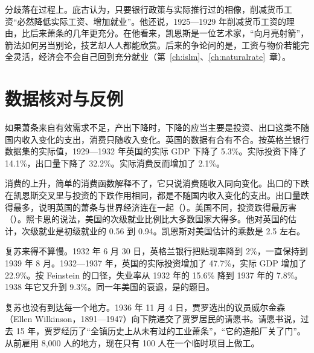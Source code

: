 分歧落在过程上。庇古认为，只要银行政策与实际推行过的相像，削减货币工资“必然降低实际工资、增加就业”\cite{pigou1936}。他还说，1925—1929 年削减货币工资的理由，比后来萧条的几年更充分\cite{pigou1936}。在他看来，凯恩斯是一位艺术家，“向月亮射箭”，箭法如何另当别论，技艺却人人都能欣赏\cite{pigou1936}。后来的争论问的是，工资与物价若能完全灵活，经济会不会自己回到充分就业（第~\ref{ch:islm}、\ref{ch:naturalrate}~章）。

\section{数据核对与反例}\label{sec:generaltheory-check}

如果萧条来自有效需求不足，产出下降时，下降的应当主要是投资、出口这类不随国内收入变化的支出，消费只随收入变化。英国的数据有合有不合。按英格兰银行数据集的实际值，1929—1932 年英国的实际 GDP 下降了 5.3\%\cite{boe2017}。实际投资下降了 14.1\%，出口量下降了 32.2\%\cite{boe2017}。实际消费反而增加了 2.1\%\cite{boe2017}。


消费的上升，简单的消费函数解释不了，它只说消费随收入同向变化。出口的下跌在凯恩斯交叉里与投资的下跌作用相同，都是不随国内收入变化的支出。出口量跌得最多，说明英国的萧条与世界经济连在一起（）。美国不同，投资跌得最厉害（）。照卡恩的说法，美国的次级就业比例比大多数国家大得多\cite{kahn1931}。他对英国的估计，次级就业是初级就业的 0.56 到 0.94\cite{kahn1931}。凯恩斯对美国估计的乘数是 2.5 左右\cite{keynes1936}。

复苏来得不算慢。1932 年 6 月 30 日，英格兰银行把贴现率降到 2\%，一直保持到 1939 年 8 月\cite{boe2017}。1932—1937 年，英国的实际投资增加了 47.7\%，实际 GDP 增加了 22.9\%\cite{boe2017}。按 Feinstein 的口径，失业率从 1932 年的 15.6\% 降到 1937 年的 7.8\%\cite{boe2017}。1938 年它又升到 9.3\%。同一年美国的衰退，是的题目。

复苏也没有到达每一个地方。1936 年 11 月 4 日，贾罗选出的议员威尔金森（Ellen Wilkinson，1891—1947）向下院递交了贾罗居民的请愿书\cite{hansard1936,hansardpeople32}。请愿书说，过去 15 年，贾罗经历了“全镇历史上从未有过的工业萧条”，“它的造船厂关了门”\cite{hansard1936}。从前雇用 8,000 人的地方，现在只有 100 人在一个临时项目上做工\cite{hansard1936}。

